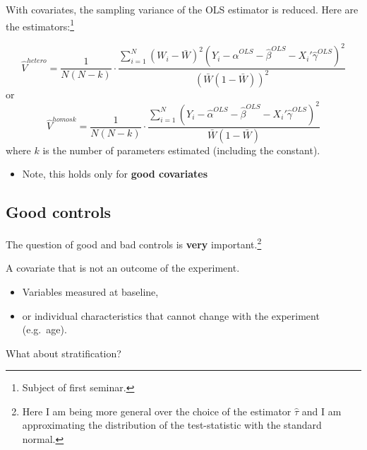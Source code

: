 \documentclass[
  letterpaper,
  DIV=11,
  numbers=noendperiod]{scrreprt}
\providecommand{\tightlist}{%
  \setlength{\itemsep}{0pt}\setlength{\parskip}{0pt}}\usepackage{longtable,booktabs,array}
\theoremstyle{definition}
\theoremstyle{remark}
\begin{document}
With covariates, the sampling variance of the OLS estimator is reduced.
Here are the estimators:\footnote{Subject of first seminar.}

\[
\hat{V}^{hetero} = \frac{1}{N(N-k)}\cdot\frac{\sum_{i=1}^{N}(W_i-\bar{W})^2(Y_i-\hat{\alpha}^{OLS}-\hat{\beta}^{OLS}-X_i'\hat{\gamma}^{OLS})^2}{\left(\bar{W}(1-\bar{W})\right)^2}
\] or \[
            \hat{V}^{homosk} = \frac{1}{N(N-k)}\cdot\frac{\sum_{i=1}^{N}(Y_i-\hat{\alpha}^{OLS}-\hat{\beta}^{OLS}-X_i'\hat{\gamma}^{OLS})^2}{\bar{W}(1-\bar{W})}
\] where \(k\) is the number of parameters estimated (including the
constant).

\par

\begin{itemize}
\tightlist
\item
  Note, this holds only for \textbf{good covariates}
\end{itemize}

\subsection{Good controls}\label{good-controls}

The question of good and bad controls is \textbf{very}
important.\footnote{Here I am being more general over the choice of the
  estimator \(\hat{\tau}\) and I am approximating the distribution of
  the test-statistic with the standard normal.}

\begin{tcolorbox}[enhanced jigsaw, bottomrule=.15mm, coltitle=black, arc=.35mm, left=2mm, opacityback=0, leftrule=.75mm, colbacktitle=quarto-callout-note-color!10!white, title={Good control}, toprule=.15mm, bottomtitle=1mm, breakable, colframe=quarto-callout-note-color-frame, opacitybacktitle=0.6, titlerule=0mm, colback=white, rightrule=.15mm, toptitle=1mm]

A covariate that is not an outcome of the experiment.

\end{tcolorbox}

\begin{itemize}
\tightlist
\item
  Variables measured at baseline,
\item
  or individual characteristics that cannot change with the experiment
  (e.g.~age).
\end{itemize}

What about stratification?
\end{document}
